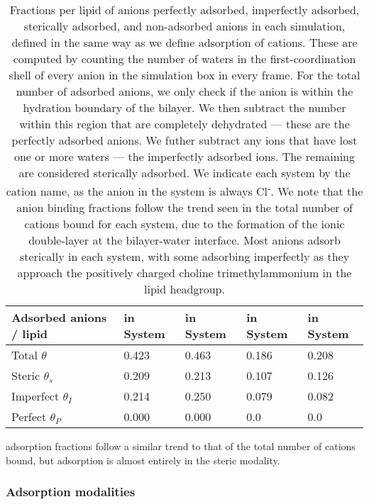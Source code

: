 \begin{table}
    \caption[Fractions per lipid of anions per adsorption modality]{Fractions per lipid of anions perfectly adsorbed, imperfectly adsorbed, sterically adsorbed, and non-adsorbed anions in each simulation, defined in the same way as we define
    adsorption of cations. These are computed
    by counting the number of waters in the first-coordination shell of every anion in the simulation box in every frame. For the total number
    of adsorbed anions, we
    only check if the anion is within the hydration boundary of the bilayer. We then subtract the number within this region that are
    completely dehydrated --- these are the perfectly adsorbed anions. We futher subtract any ions that have lost
    one or more waters --- the imperfectly adsorbed
    ions. The remaining are considered sterically adsorbed. We indicate each system by the cation name, as the anion in the system is always Cl\textsuperscript{-}.
    We note that the anion binding fractions follow the trend seen in the total number of cations bound for each system, due to the formation of the ionic double-layer
    at the bilayer-water interface.
    Most anions adsorb sterically in each system, with some adsorbing imperfectly as they approach the positively charged choline trimethylammonium in the lipid headgroup.}
    \label{tabch3:anionfrac}\tiny
    \begin{tabularx}{\textwidth}{|X|X|X|X|X|}\hline
    Adsorbed anions / lipid     & \cl{} in \na{} System & \cl{} in \li{} System & \cl{} in \mgmbnbfix{} System& \cl{} in \mgmicro{} System\\\hline
    Total      $\theta  $&0.423&0.463& 0.186&0.208 \\\hline
    Steric     $\theta_s$&0.209&0.213& 0.107&0.126 \\\hline
    Imperfect  $\theta_I$&0.214&0.250& 0.079&0.082 \\\hline
    Perfect    $\theta_P$&0.000&0.000&  0.0 & 0.0  \\\hline

    \end{tabularx}
\end{table}
\cl{} adsorption fractions follow a similar trend to that of the total number of cations bound, but adsorption
is almost entirely in the steric modality.




\subsubsection{Adsorption modalities}

